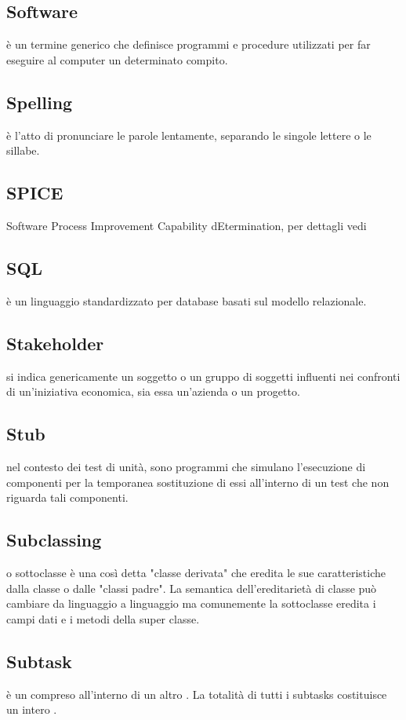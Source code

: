 \documentclass[12pt,a4paper]{article}
\begin{document}
\subsection{Software} 
è un termine generico che definisce programmi e procedure utilizzati per far eseguire al computer un determinato compito.

\subsection{Spelling} 
è l'atto di pronunciare le parole lentamente, separando le singole lettere o le sillabe.

\subsection{SPICE} 
 Software Process Improvement Capability
dEtermination, per dettagli vedi \PdQ

\subsection{SQL} 
è un linguaggio standardizzato per database basati sul modello relazionale.

\subsection{Stakeholder} 
si indica genericamente un soggetto o un gruppo di soggetti influenti nei confronti di un'iniziativa economica, sia essa un'azienda o un progetto.

\subsection{Stub} 
nel contesto dei test di unità, sono programmi che simulano l'esecuzione di componenti  per la temporanea sostituzione di essi all'interno di un test  che non riguarda tali componenti.

\subsection{Subclassing} 
o sottoclasse è una così detta "classe derivata" che eredita le sue caratteristiche dalla classe o dalle "classi padre". La semantica dell'ereditarietà di classe può cambiare da linguaggio a linguaggio ma comunemente la sottoclasse eredita i campi dati e i metodi della super classe.

\subsection{Subtask} 
è un  compreso all'interno di un altro . La totalità di tutti i subtasks costituisce un intero .
\end{document}
